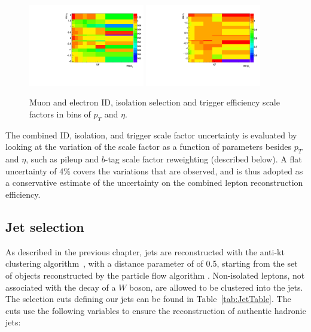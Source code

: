 \begin{figure}[hbtp]
 \begin{center}
   \includegraphics[width=0.45\textwidth]{Figures/Analysis_1_Diagrams/2d_mu_pt_eta_full_id_iso_hlt_data_over_mc.pdf}
   \includegraphics[width=0.45\textwidth]{Figures/Analysis_1_Diagrams/2d_ele_pt_eta_full_id_iso_hlt_data_over_mc.pdf}
   \caption{Muon and electron ID, isolation selection and trigger efficiency scale factors in bins of $p_{T}$ and $\eta$.}
   \label{fig:effSFHLT}
 \end{center}
\end{figure}

\par The combined ID, isolation, and trigger scale factor
uncertainty is evaluated by looking at the variation of the scale
factor as a function of parameters besides $p_T$ and $\eta$, such as
pileup and $b$-tag scale factor reweighting (described below).  A flat uncertainty of 4$\%$
covers the variations that are observed, and is thus adopted as a
conservative estimate of the uncertainty on the combined lepton
reconstruction efficiency.  

\subsection{Jet selection}
\label{jet_selection_overview}

\par As described in the previous chapter, jets are reconstructed with
the anti-kt clustering algorithm~\cite{Cacciari:2008gp}, with a
distance parameter of of 0.5, starting from the set of objects
reconstructed by the particle flow algorithm
\cite{CMS-PAS-PFT-09-001}. Non-isolated leptons, not associated
with the decay of a $W$ boson, are allowed to be clustered into the
jets.  The selection cuts defining our jets can 
be found in Table~\ref{tab:JetTable}.  The cuts use the following
variables to ensure the reconstruction of authentic hadronic jets:

